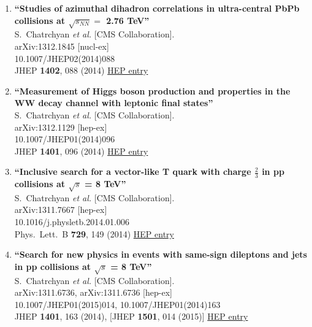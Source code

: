 \documentclass{article}
\begin{document}
\begin{enumerate}
\item%
{\bf ``Studies of azimuthal dihadron correlations in ultra-central PbPb collisions at $\sqrt{s_{NN}} =$ 2.76 TeV''}
  \\{}S.~Chatrchyan {\it et al.} [CMS Collaboration].
  \\{}arXiv:1312.1845 [nucl-ex]
    \\{}10.1007/JHEP02(2014)088
\\{}JHEP {\bf 1402}, 088 (2014) %
\href{http://inspirehep.net/record/1268151}{HEP entry}


\item%
{\bf ``Measurement of Higgs boson production and properties in the WW decay channel with leptonic final states''}
  \\{}S.~Chatrchyan {\it et al.} [CMS Collaboration].
  \\{}arXiv:1312.1129 [hep-ex]
    \\{}10.1007/JHEP01(2014)096
\\{}JHEP {\bf 1401}, 096 (2014) %
\href{http://inspirehep.net/record/1267508}{HEP entry}


\item%
{\bf ``Inclusive search for a vector-like T quark with charge $\frac{2}{3}$ in pp collisions at $\sqrt{s}$ = 8 TeV''}
  \\{}S.~Chatrchyan {\it et al.} [CMS Collaboration].
  \\{}arXiv:1311.7667 [hep-ex]
    \\{}10.1016/j.physletb.2014.01.006
\\{}Phys.\ Lett.\ B {\bf 729}, 149 (2014) %
\href{http://inspirehep.net/record/1266766}{HEP entry}


\item%
{\bf ``Search for new physics in events with same-sign dileptons and jets in pp collisions at $\sqrt{s}$ = 8 TeV''}
  \\{}S.~Chatrchyan {\it et al.} [CMS Collaboration].
  \\{}arXiv:1311.6736, arXiv:1311.6736 [hep-ex]
    \\{}10.1007/JHEP01(2015)014, 10.1007/JHEP01(2014)163
\\{}JHEP {\bf 1401}, 163 (2014), [JHEP {\bf 1501}, 014 (2015)] %
\href{http://inspirehep.net/record/1266257}{HEP entry}



\end{enumerate}
\end{document}
